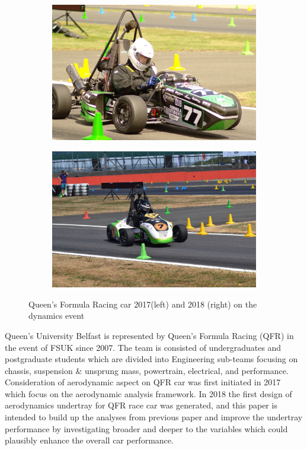 \begin{figure}[!ht]
\begin{center}
%    
  \begin{subfigure}[b]{0.4\textwidth}
    \includegraphics[scale=0.05]{Figures/QFR17PHOTO.JPG}
  \end{subfigure}
  \begin{subfigure}[b]{0.4\textwidth}
    \includegraphics[scale=0.05]{Figures/QFR18PHOTO.jpg}
  \end{subfigure}
%  
  \caption{Queen's Formula Racing car 2017(left) and 2018 (right) on the dynamics event}
    \label{fig:1}
\end{center}
\end{figure}


Queen's University Belfast is represented by Queen's Formula Racing (QFR) in the event of FSUK since 2007. The team is consisted of undergraduates and postgraduate students which are divided into Engineering sub-teams focusing on chassis, suspension \& unsprung mass, powertrain, electrical, and performance. Consideration of aerodynamic aspect on QFR car was first initiated in 2017 which focus on the aerodynamic analysis framework\cite{Corr2017MechanicalAuthor}. In 2018 the first design of aerodynamics undertray for QFR race car was generated\cite{McKeown2018DesignCar}, and this paper is intended to build up the analyses from previous paper and improve the undertray performance by investigating broader and deeper to the variables which could plausibly enhance the overall car performance.  

